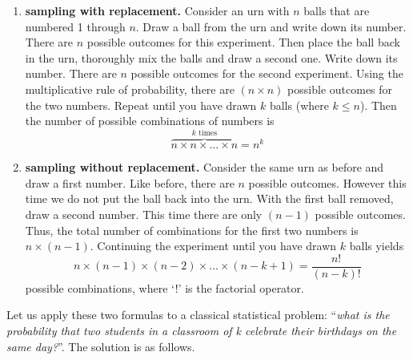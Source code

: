 \begin{enumerate}
\item{\bf sampling with replacement.} Consider an urn with $n$ balls
  that are numbered 1 through $n$. Draw a ball from the urn and write
  down its number. There are $n$ possible outcomes for this
  experiment.  Then place the ball back in the urn, thoroughly mix the
  balls and draw a second one. Write down its number. There are $n$
  possible outcomes for the second experiment. Using the
  multiplicative rule of probability, there are $(n\times{n})$
  possible outcomes for the two numbers. Repeat until you have drawn
  $k$ balls (where $k \leq n$). Then the number of possible
  combinations of numbers is
  \begin{equation}
  \overset{k \mbox{~times}}{\overbrace{n\times{n}\times{\ldots}\times{n}}} = n^k
  \end{equation}
  
\item{\bf sampling without replacement.} Consider the same urn as
  before and draw a first number. Like before, there are $n$ possible
  outcomes.  However this time we do not put the ball back into the
  urn. With the first ball removed, draw a second number. This time
  there are only $(n - 1)$ possible outcomes. Thus, the total number
  of combinations for the first two numbers is $n \times (n-1)$. Continuing
  the experiment until you have drawn $k$ balls yields 
  \begin{equation}
  n\times(n-1)\times(n-2)\times{\ldots}\times(n-k+1) = \frac{n!}{(n-k)!}
  \end{equation}
  possible combinations, where `!' is the factorial operator.

\end{enumerate}

Let us apply these two formulas to a classical statistical problem:
``\textit{what is the probability that two students in a classroom of
  k celebrate their birthdays on the same day?}''. The solution is as
follows.

